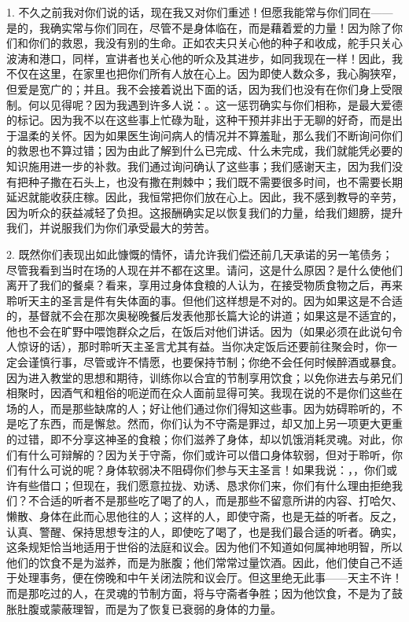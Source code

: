 1. 不久之前我对你们说的话，现在我又对你们重述！但愿我能常与你们同在——是的，我确实常与你们同在，尽管不是身体临在，而是藉着爱的力量！因为除了你们和你们的救恩，我没有别的生命。正如农夫只关心他的种子和收成，舵手只关心波涛和港口，同样，宣讲者也关心他的听众及其进步，如同我现在一样！因此，我不仅在这里，在家里也把你们所有人放在心上。因为即使人数众多，我心胸狭窄，但爱是宽广的；并且。我不会接着说出下面的话，因为我们也没有在你们身上受限制。何以见得呢？因为我遇到许多人说：。这一惩罚确实与你们相称，是最大爱德的标记。因为我不以在这些事上忙碌为耻，这种干预并非出于无聊的好奇，而是出于温柔的关怀。因为如果医生询问病人的情况并不算羞耻，那么我们不断询问你们的救恩也不算过错；因为由此了解到什么已完成、什么未完成，我们就能凭必要的知识施用进一步的补救。我们通过询问确认了这些事；我们感谢天主，因为我们没有把种子撒在石头上，也没有撒在荆棘中；我们既不需要很多时间，也不需要长期延迟就能收获庄稼。因此，我恒常把你们放在心上。因此，我不感到教导的辛劳，因为听众的获益减轻了负担。这报酬确实足以恢复我们的力量，给我们翅膀，提升我们，并说服我们为你们承受最大的劳苦。\par

2. 既然你们表现出如此慷慨的情怀，请允许我们偿还前几天承诺的另一笔债务；尽管我看到当时在场的人现在并不都在这里。请问，这是什么原因？是什么使他们离开了我们的餐桌？看来，享用过身体食粮的人认为，在接受物质食物之后，再来聆听天主的圣言是件有失体面的事。但他们这样想是不对的。因为如果这是不合适的，基督就不会在那次奥秘晚餐后发表他那长篇大论的讲道；如果这是不适宜的，他也不会在旷野中喂饱群众之后，在饭后对他们讲话。因为（如果必须在此说句令人惊讶的话），那时聆听天主圣言尤其有益。当你决定饭后还要前往聚会时，你一定会谨慎行事，尽管或许不情愿，也要保持节制；你绝不会任何时候醉酒或暴食。因为进入教堂的思想和期待，训练你以合宜的节制享用饮食；以免你进去与弟兄们相聚时，因酒气和粗俗的呃逆而在众人面前显得可笑。我现在说的不是你们这些在场的人，而是那些缺席的人；好让他们通过你们得知这些事。因为妨碍聆听的，不是吃了东西，而是懈怠。然而，你们认为不守斋是罪过，却又加上另一项更大更重的过错，即不分享这神圣的食粮；你们滋养了身体，却以饥饿消耗灵魂。对此，你们有什么可辩解的？因为关于守斋，你们或许可以借口身体软弱，但对于聆听，你们有什么可说的呢？身体软弱决不阻碍你们参与天主圣言！如果我说：，，你们或许有些借口；但现在，我们愿意拉拢、劝诱、恳求你们来，你们有什么理由拒绝我们？不合适的听者不是那些吃了喝了的人，而是那些不留意所讲的内容、打哈欠、懒散、身体在此而心思他往的人；这样的人，即使守斋，也是无益的听者。反之，认真、警醒、保持思想专注的人，即使吃了喝了，也是我们最合适的听者。确实，这条规矩恰当地适用于世俗的法庭和议会。因为他们不知道如何属神地明智，所以他们的饮食不是为滋养，而是为胀腹；他们常常过量饮酒。因此，他们使自己不适于处理事务，便在傍晚和中午关闭法院和议会厅。但这里绝无此事——天主不许！而是那吃过的人，在灵魂的节制方面，将与守斋者争胜；因为他饮食，不是为了鼓胀肚腹或蒙蔽理智，而是为了恢复已衰弱的身体的力量。\par

